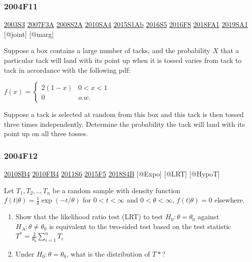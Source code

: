 \documentclass[6pt,twocolumn,Portrait]{article}
\begin{document}
\hypertarget{f11}{%
\subsubsection{2004F11}\label{f11}}

\protect\hyperlink{s3}{2003S3} \protect\hyperlink{f3a}{2007F3A}
\protect\hyperlink{s2a}{2008S2A} \protect\hyperlink{sa4-1}{2010SA4}
\protect\hyperlink{s1ab}{2015S1Ab} \protect\hyperlink{s5-4}{2016S5}
\protect\hyperlink{f8-4}{2016F8} \protect\hyperlink{fa1-4}{2018FA1}
\protect\hyperlink{sa1-3}{2019SA1} {[}@joint{]} {[}@marg{]}

Suppose a box contains a large number of tacks, and the probability
\(X\) that a particular tack will land with its point up when it is
tossed varies from tack to tack in accordance with the following pdf:

\(f(x)=\begin{cases}2(1-x)&0<x<1\\0& o.w.\end{cases}\)

Suppose a tack is selected at random from this box and this tack is then
tossed three times independently. Determine the probability the tack
will land with its point up on all three tosses.

\hypertarget{f12}{%
\subsubsection{2004F12}\label{f12}}

\protect\hyperlink{sb4}{2010SB4} \protect\hyperlink{fb4-1}{2010FB4}
\protect\hyperlink{s6-2}{2011S6} \protect\hyperlink{f5-5}{2015F5}
\protect\hyperlink{s4b-2}{2018S4B} {[}@Expo{]} {[}@LRT{]} {[}@HypoT{]}

Let \(T_1,T_2,..,T_n\) be a random sample with density function
\(f(t|\theta)=\frac1\theta\exp(-t/\theta)\) for \(0<t<\infty\) and
\(0<\theta<\infty\), \(f(t|\theta)=0\) elsewhere.

\begin{enumerate}
\def\labelenumi{(\alph{enumi})}
\item
  Show that the likelihood ratio test (LRT) to test
  \(H_0:\theta=\theta_0\) against \(H_A:\theta\neq\theta_0\) is
  equivalent to the two-sided test based on the test statistic
  \(T^*=\frac{2}{\theta_0}\sum^n_{i=1}T_i\)
\item
  Under \(H_0:\theta=\theta_0\), what is the distribution of \(T*\)?
\end{enumerate}
\end{document}

